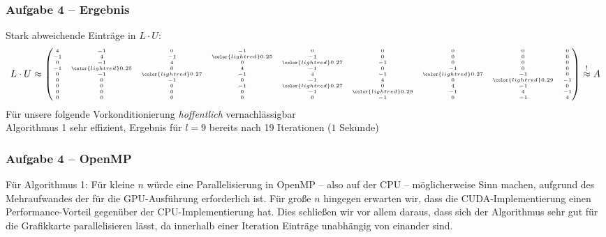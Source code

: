 \documentclass[german,notes,18pt]{beamer}
\begin{document}
	\begin{frame}
		\frametitle{Aufgabe 4 -- Ergebnis}
		Stark abweichende Einträge in $L\cdot U$:
		\begin{equation*}
		\tiny
		L\cdot U\approx \begin{pmatrix}
		4 & -1 &  0 & -1 &  0 & 0 &  0  & 0  & 0 \\
		-1  & 4 & -1 &  \color{lightred}0.25 & -1 &  0 &  0 &  0 &  0 \\
		0 & -1  & 4 &  0 &  \color{lightred}0.27 & -1  & 0  & 0  & 0 \\
		-1 &  \color{lightred}0.25 &  0 &  4 & -1 &  0 & -1 &  0 &  0 \\
		0 & -1 &  \color{lightred}0.27 & -1 &  4 & -1  & \color{lightred}0.27 & -1 &  0 \\
		0 &  0 & -1 &  0 & -1 &  4 &  0 & \color{lightred}0.29 & -1 \\
		0 &  0 &  0 & -1 &  \color{lightred}0.27 &  0 &  4 & -1 &  0 \\
		0 &  0 &  0 &  0 & -1 &  \color{lightred}0.29 & -1 &  4 & -1 \\
		0 &  0 &  0 &  0 &  0 & -1 &  0 & -1 &  4
		\end{pmatrix}
		\stackrel{!}{\approx}A
		\end{equation*}
		\vspace{2em}
		Für unsere folgende Vorkonditionierung \emph{hoffentlich} vernachlässigbar \\
		\vspace{2em}
		Algorithmus 1 sehr effizient, Ergebnis für $l=9$ bereits nach 19 Iterationen ($1$ Sekunde)
	\end{frame}
	\begin{frame}
		\frametitle{Aufgabe 4 -- OpenMP}
		Für Algorithmus 1: Für kleine $n$ würde eine Parallelisierung in OpenMP -- also auf der CPU -- möglicherweise Sinn machen, aufgrund des Mehraufwandes der für die GPU-Ausführung erforderlich ist. Für große $n$ hingegen erwarten wir, dass die CUDA-Implementierung einen Performance-Vorteil gegenüber der CPU-Implementierung hat. Dies schließen wir vor allem daraus, dass sich der Algorithmus sehr gut für die Grafikkarte parallelisieren lässt, da innerhalb einer Iteration Einträge unabhängig von einander sind.
	\end{frame}
\end{document}

